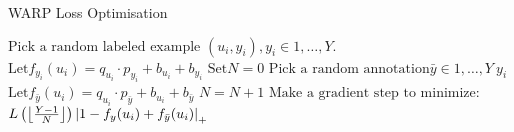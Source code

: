 \begin{algorithm}
\caption{WARP Loss Optimisation} \label{WARP}
\begin{algorithmic}[1]
	\Repeat
	\State $\text{Pick a random labeled example }(u_i, y_i), y_i \in {1, \ldots, Y}.$
	\State $\text{Let} f_{y_i}(u_i) = q_{u_i} \cdot p_{y_i} + b_{u_i} + b_{y_i}$
	\State $\text{Set} N = 0$
	\Repeat
		\State $\text{Pick a random annotation} \bar{y} \in {1, \ldots, Y} \ y_i$
		\State $\text{Let} f_{\bar{y}} (u_i) = q_{u_i} \cdot p_{\bar{y}} + b_{u_i} + b_{\bar{y}}$
		\State $N = N + 1$
		\State $\text{Make a gradient step to minimize:}$
		\State $L \left( \floor*{\frac{Y-1}{N}} \right) {\lvert 1 - f_y(u_i) + f_{\bar{y}} (u_i) \rvert}_+$	
	\EndIf
\EndFunction
\end{algorithmic}
\end{algorithm}







